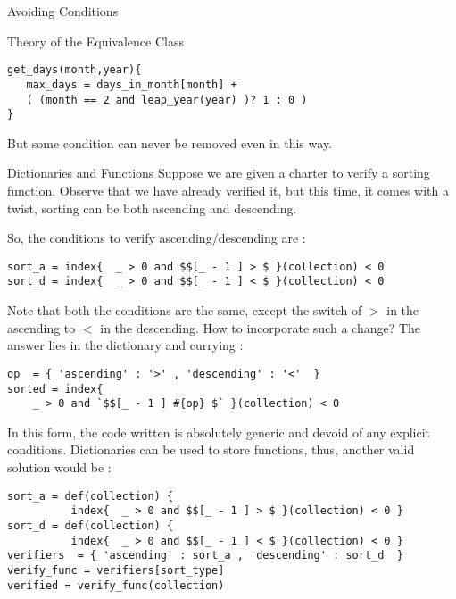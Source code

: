 \begin{section}{Avoiding Conditions}
\begin{subsection}{Theory of the Equivalence Class}
\begin{lstlisting}[style=JexlStyle]
get_days(month,year){
   max_days = days_in_month[month] + 
   ( (month == 2 and leap_year(year) )? 1 : 0 )
}
\end{lstlisting} 
But some condition can never be removed even in this way.
\end{subsection}

\begin{subsection}{Dictionaries and Functions}
Suppose we are given a charter to verify a sorting function.
Observe that we have already verified it, but this time, 
it comes with a twist, sorting can be both ascending and descending.

So, the conditions to verify ascending/descending are :

\begin{lstlisting}[style=JexlStyle]
sort_a = index{  _ > 0 and $$[_ - 1 ] > $ }(collection) < 0 
sort_d = index{  _ > 0 and $$[_ - 1 ] < $ }(collection) < 0 
\end{lstlisting} 

Note that both the conditions are the same, except the switch of $>$ in the ascending 
to  $<$ in the descending. How to incorporate such a change?
The answer lies in the dictionary and currying :

\begin{lstlisting}[style=JexlStyle]
op  = { 'ascending' : '>' , 'descending' : '<'  }
sorted = index{ 
    _ > 0 and `$$[_ - 1 ] #{op} $` }(collection) < 0 
\end{lstlisting} 

In this form, the code written is absolutely generic and devoid of any explicit conditions.
Dictionaries can be used to store functions, thus, another valid solution would be :

\begin{lstlisting}[style=JexlStyle]
sort_a = def(collection) { 
          index{  _ > 0 and $$[_ - 1 ] > $ }(collection) < 0 }
sort_d = def(collection) { 
          index{  _ > 0 and $$[_ - 1 ] < $ }(collection) < 0 }
verifiers  = { 'ascending' : sort_a , 'descending' : sort_d  }
verify_func = verifiers[sort_type] 
verified = verify_func(collection)
\end{lstlisting} 
\end{subsection}


\end{section}
